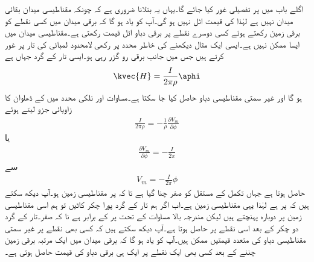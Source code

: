 اگلے باب میں  پر تفصیلی غور کیا جائے گا۔یہاں یہ بتلانا ضروری ہے کہ چونکہ مقناطیسی میدان  بقائی میدان نہیں ہے لہٰذا  کی قیمت اٹل نہیں ہو گی۔آپ کو یاد ہو گا کہ برقی میدان میں کسی نقطے کو برقی زمین رکھتے ہوئے کسی دوسرے نقطے پر برقی دباو اٹل قیمت رکھتی ہے۔مقناطیسی میدان میں ایسا ممکن نہیں ہے۔ایسی ایک مثال دیکھنے کی خاطر  محدد پر رکھی لامحدود لمبائی کی تار پر غور کرتے ہیں جس میں  جانب  برقی رو گزر رہی ہو۔ایسی تار کے گرد جہاں  ہے
\begin{align*}
\kvec{H}=\frac{I}{2\pi \rho} \aphi
\end{align*}
ہو گا اور غیر سمتی مقناطیسی دباو حاصل کیا جا سکتا ہے۔مساوات  اور نلکی محدد میں  کے ڈھلوان کا زاویائی جزو لیتے ہوئے
\begin{align*}
\frac{I}{2\pi \rho} =-\frac{1}{\rho} \frac{\partial V_m}{\partial \phi}
\end{align*}
یا
\begin{align*}
\frac{\partial V_m}{\partial \phi}=-\frac{I}{2\pi}
\end{align*}
سے
\begin{align*}
V_m=-\frac{I}{2\pi}\phi
\end{align*}
حاصل ہوتا ہے جہاں تکمل کے مستقل کو صفر چنا گیا ہے تا کہ  پر مقناطیسی زمین ہو۔آپ دیکھ سکتے ہیں کہ  پر  ہے لہٰذا یہی مقناطیسی زمین ہے۔اب اگر ہم تار کے گرد پورا چکر کاٹیں تو ہم اسی مقناطیسی زمین پر دوبارہ پہنچتے ہیں لیکن مندرجہ بالا مساوات کے تحت  پر  کے برابر ہے نا کہ صفر۔تار کے گرد دو چکر کے بعد اسی نقطے پر  حاصل ہوتا ہے۔آپ دیکھ سکتے ہیں کہ کسی بھی نقطے پر غیر سمتی مقناطیسی دباو کی متعدد قیمتیں ممکن ہیں۔آپ کو یاد ہو گا کہ برقی میدان میں ایک مرتبہ برقی زمین چننے کے بعد کسی بھی ایک نقطے پر ایک ہی برقی دباو کی قیمت حاصل ہوتی ہے۔

